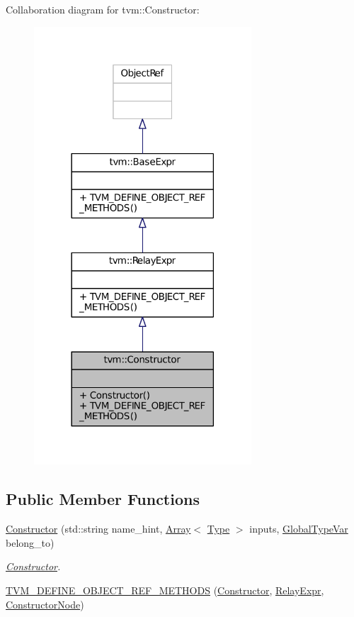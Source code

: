 Collaboration diagram for tvm\+:\+:Constructor\+:
\nopagebreak
\begin{figure}[H]
\begin{center}
\leavevmode
\includegraphics[width=230pt]{classtvm_1_1Constructor__coll__graph}
\end{center}
\end{figure}
\subsection*{Public Member Functions}
\begin{DoxyCompactItemize}
\item 
\hyperlink{classtvm_1_1Constructor_ab38dcd8d355b10ef2073bcb8200ae8e4}{Constructor} (std\+::string name\+\_\+hint, \hyperlink{classtvm_1_1Array}{Array}$<$ \hyperlink{classtvm_1_1Type}{Type} $>$ inputs, \hyperlink{classtvm_1_1GlobalTypeVar}{Global\+Type\+Var} belong\+\_\+to)
\begin{DoxyCompactList}\small\item\em \hyperlink{classtvm_1_1Constructor}{Constructor}. \end{DoxyCompactList}\item 
\hyperlink{classtvm_1_1Constructor_aa306ba03a2454685c51554f9b8b47dc6}{T\+V\+M\+\_\+\+D\+E\+F\+I\+N\+E\+\_\+\+O\+B\+J\+E\+C\+T\+\_\+\+R\+E\+F\+\_\+\+M\+E\+T\+H\+O\+DS} (\hyperlink{classtvm_1_1Constructor}{Constructor}, \hyperlink{classtvm_1_1RelayExpr}{Relay\+Expr}, \hyperlink{classtvm_1_1ConstructorNode}{Constructor\+Node})
\end{DoxyCompactItemize}


